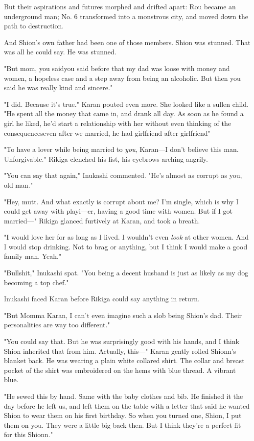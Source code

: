 But their aspirations and futures morphed and drifted apart: Rou became
an underground man; No. 6 transformed into a monstrous city, and moved
down the path to destruction.

And Shion's own father had been one of those members. Shion was stunned.
That was all he could say. He was stunned.

"But mom, you said\el you said before that my dad was loose with money
and women, a hopeless case and a step away from being an alcoholic. But
then you said he was really kind and sincere."

"I did. Because it's true." Karan pouted even more. She looked like a
sullen child. "He spent all the money that came in, and drank all day.
As soon as he found a girl he liked, he'd start a relationship with her
without even thinking of the consequences\el even after we married, he
had girlfriend after girlfriend\el "

"To have a lover while being married to \emph{you}, Karan---I don't believe this
man. Unforgivable." Rikiga clenched his fist, his eyebrows arching
angrily.

"You can say that again," Inukashi commented. "He's almost as corrupt as
you, old man."

"Hey, mutt. And what exactly is corrupt about me? I'm single, which is
why I could get away with playi---er, having a good time with women. But
if I got married---" Rikiga glanced furtively at Karan, and took a breath.

"I would love her for as long as I lived. I wouldn't even \emph{look} at other
women. And I would stop drinking. Not to brag or anything, but I think I
would make a good family man. Yeah."

"Bullshit," Inukashi spat. "You being a decent husband is just as likely
as my dog becoming a top chef."

Inukashi faced Karan before Rikiga could say anything in return.

"But Momma Karan, I can't even imagine such a slob being Shion's dad.
Their personalities are way too different."

"You could say that. But he was surprisingly good with his hands, and I
think Shion inherited that from him. Actually, this---" Karan gently
rolled Shionn's blanket back. He was wearing a plain white collared
shirt. The collar and breast pocket of the shirt was embroidered on the
hems with blue thread. A vibrant blue.

"He sewed this by hand. Same with the baby clothes and bib. He finished
it the day before he left us, and left them on the table with a letter
that said he wanted Shion to wear them on his first birthday. So when
you turned one, Shion, I put them on you. They were a little big back
then. But I think they're a perfect fit for this Shionn."

